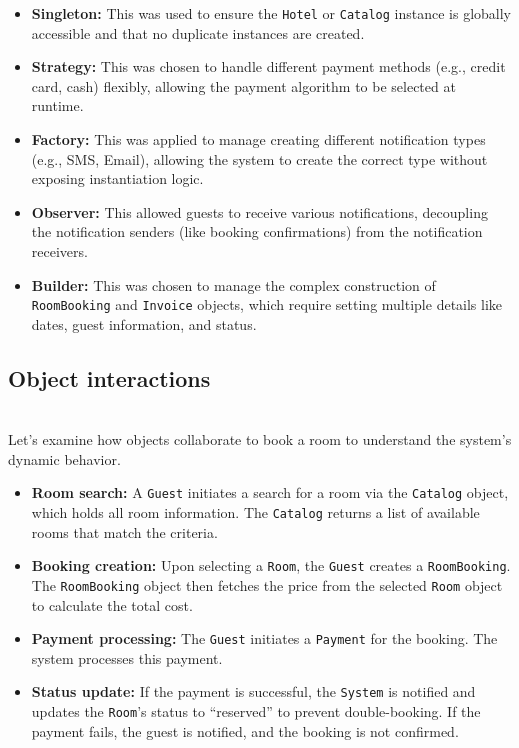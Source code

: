 \begin{itemize}
\item
\protect{}\label{hYwsuqvXcHb5V76DR8one}
\textbf{Singleton:} This was used to ensure the \texttt{Hotel} or \texttt{Catalog} instance is globally accessible and that no duplicate instances are created.
\item
\protect{}\label{y6_8UL2SohvlfGY-rYkbk}
\textbf{Strategy:} This was chosen to handle different payment methods (e.g., credit card, cash) flexibly, allowing the payment algorithm to be selected at runtime.
\item
\protect{}\label{Bh-wL1IJaTlNBshljbiUH}
\textbf{Factory:} This was applied to manage creating different notification types (e.g., SMS, Email), allowing the system to create the correct type without exposing instantiation logic.
\item
\protect{}\label{GNb0zL5WkUrFst3VVtjzX}
\textbf{Observer:} This allowed guests to receive various notifications, decoupling the notification senders (like booking confirmations) from the notification receivers.
\item
\protect{}\label{SB0JmUlP_LI4EpqEHQ6cq}
\textbf{Builder:} This was chosen to manage the complex construction of \texttt{RoomBooking} and \texttt{Invoice} objects, which require setting multiple details like dates, guest information, and status.
\end{itemize}

\subsection{Object interactions}\label{wZ7LOzHawTU5hjtjWallt}
\\
Let's examine how objects collaborate to book a room to understand the system's dynamic behavior.

\begin{itemize}
\item
\protect{}\label{ppPDwUVnoJctJjj8mv_W0}
\textbf{Room search:} A \texttt{Guest} initiates a search for a room via the \texttt{Catalog} object, which holds all room information. The \texttt{Catalog} returns a list of available rooms that match the criteria.
\item
\protect{}\label{WOgWTI7t3TcfoSTUAnZsb}
\textbf{Booking creation:} Upon selecting a \texttt{Room}, the \texttt{Guest} creates a \texttt{RoomBooking}. The \texttt{RoomBooking} object then fetches the price from the selected \texttt{Room} object to calculate the total cost.
\item
\protect{}\label{cm-qgjZ5bdoCRLXi0Ebj0}
\textbf{Payment processing:} The \texttt{Guest} initiates a \texttt{Payment} for the booking. The system processes this payment.
\item
\protect{}\label{qXxoKBUMvAY8IxJpxZ5J_}
\textbf{Status update:} If the payment is successful, the \texttt{System} is notified and updates the \texttt{Room}'s status to ``reserved'' to prevent double-booking. If the payment fails, the guest is notified, and the booking is not confirmed.
\end{itemize}

